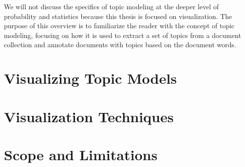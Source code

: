 We will not discuss the specifics of topic modeling at the deeper level of probability and statistics because this thesis is focused on visualization. The purpose of this overview is to familiarize the reader with the concept of topic modeling, focusing on how it is used to extract a set of topics from a document collection and annotate documents with topics based on the document words.

\section{Visualizing Topic Models}



\section{Visualization Techniques}



\section{Scope and Limitations}


